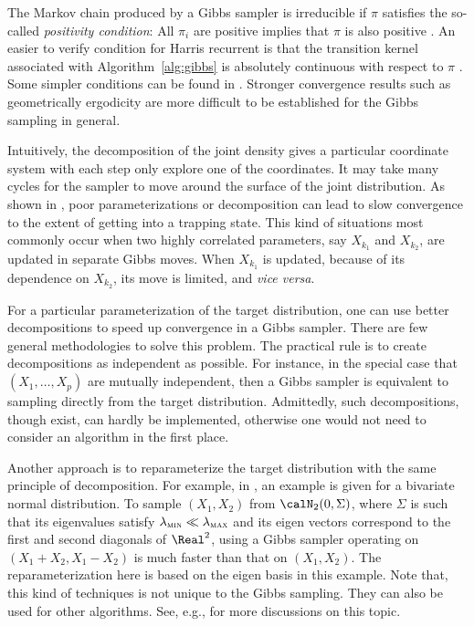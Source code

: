 

The Markov chain produced by a Gibbs sampler is irreducible if $\pi$ satisfies
the so-called \emph{positivity condition}: All $\pi_i$ are positive implies
that $\pi$ is also positive \cite[][Theorem~10.8]{Robert:2004tn}. An easier to
verify condition for Harris recurrent is that the transition kernel associated
with Algorithm~\ref{alg:gibbs} is absolutely continuous with respect to $\pi$
\cite{Tierney:1994uk}. Some simpler conditions can be found in
\cite{Hobert:1997vx}. Stronger convergence results such as geometrically
ergodicity are more difficult to be established for the Gibbs sampling in
general.

Intuitively, the decomposition of the joint density gives a particular
coordinate system with each step only explore one of the coordinates. It may
take many cycles for the sampler to move around the surface of the joint
distribution. As shown in \cite[][note~9.7.1]{Robert:2004tn}, poor
parameterizations or decomposition can lead to slow convergence to the extent
of getting into a trapping state. This kind of situations most commonly occur
when two highly correlated parameters, say $X_{k_1}$ and $X_{k_2}$, are
updated in separate Gibbs moves. When $X_{k_1}$ is updated, because of its
dependence on $X_{k_2}$, its move is limited, and \emph{vice versa}.

For a particular parameterization of the target distribution, one can use
better decompositions to speed up convergence in a Gibbs sampler. There are
few general methodologies to solve this problem. The practical rule is to
create decompositions as independent as possible. For instance, in the special
case that $(X_1,\dots,X_p)$ are mutually independent, then a Gibbs sampler is
equivalent to sampling directly from the target distribution. Admittedly, such
decompositions, though exist, can hardly be implemented, otherwise one would
not need to consider an \mcmc algorithm in the first place.

Another approach is to reparameterize the target distribution with the same
principle of decomposition. For example, in
\cite[][sec.~10.4.1]{Robert:2004tn}, an example is given for a bivariate
normal distribution. To sample $(X_1,X_2)$ from $\calN_2(0, \Sigma)$, where
$\Sigma$ is such that its eigenvalues satisfy $\lambda_{\text{\textsc{min}}}
\ll \lambda_{\text{\textsc{max}}}$  and its eigen vectors correspond to the
first and second diagonals of $\Real^2$, using a Gibbs sampler operating on
$(X_1 + X_2, X_1 - X_2)$ is much faster than that on $(X_1,X_2)$. The
reparameterization here is based on the eigen basis in this example. Note
that, this kind of techniques is not unique to the Gibbs sampling. They can
also be used for other \mcmc algorithms. See, e.g.,
\cite{Hills:1993vb,Gilks:1996vx} for more discussions on this topic.

